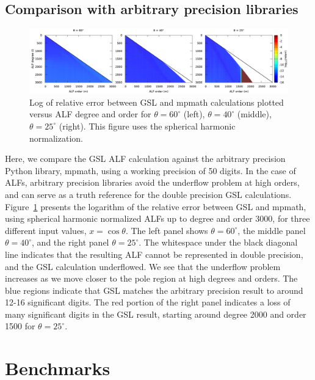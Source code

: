 \documentclass[12pt]{article}
\begin{document}
\subsection{Comparison with arbitrary precision libraries}

\begin{figure}[ht]
\includegraphics[width=\textwidth]{plots/compare.png}
\caption{
Log of relative error between GSL and mpmath calculations plotted versus
ALF degree and order for $\theta = 60^{\circ}$ (left),
$\theta = 40^{\circ}$ (middle),
$\theta = 25^{\circ}$ (right). This figure uses the spherical
harmonic normalization.
}
\label{fig:compare}
\end{figure}

Here, we compare the GSL ALF calculation against the
arbitrary precision Python library, mpmath, using a working
precision of 50 digits. In the case of ALFs, arbitrary precision
libraries avoid the underflow problem at high orders, and can
serve as a truth reference for the double precision GSL calculations.
Figure~\ref{fig:compare} presents the logarithm of the relative error
between GSL and mpmath, using spherical harmonic normalized ALFs up to
degree and order 3000, for three different input values, $x = \cos{\theta}$.
The left panel shows $\theta = 60^{\circ}$, the middle panel
$\theta = 40^{\circ}$, and the right panel $\theta = 25^{\circ}$. The
whitespace under the black diagonal line indicates that the resulting
ALF cannot be represented in double precision, and the GSL calculation
underflowed. We see that the underflow problem increases as we move
closer to the pole region at high degrees and orders. The blue regions
indicate that GSL matches the arbitrary precision result to around 12-16
significant digits. The red portion of the right panel indicates a
loss of many significant digits in the GSL result, starting around
degree 2000 and order 1500 for $\theta = 25^{\circ}$.

\section{Benchmarks}
\end{document}
